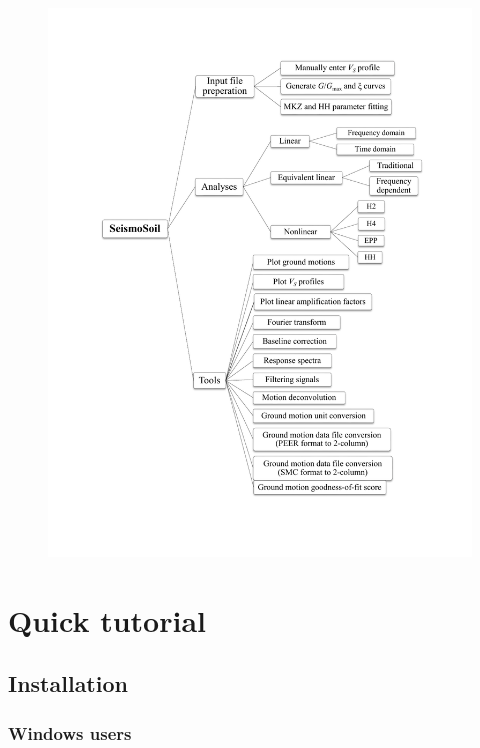\documentclass[11pt,letterpaper]{article}
\begin{document}
\begin{figure}[H]
\centering
  \includegraphics[height=.95\textheight]{functionality_structure.pdf}\\
\end{figure}

\section{Quick tutorial}
\subsection{Installation}

\subsubsection{Windows users}
\end{document}
